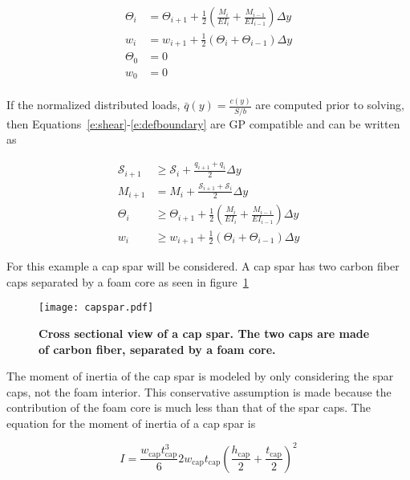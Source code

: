 \documentclass[]{aiaa-tc}%
\begin{document}
\begin{align}
    \label{e:angle}
    \Theta_{i} &= \Theta_{i+1} + \frac{1}{2} \left(\frac{M_i}{EI_i} + \frac{M_{i-1}}{EI_{i-1}} \right) \Delta y \\
    \label{e:deflection}
    w_{i} &= w_{i+1} + \frac{1}{2} (\Theta_i + \Theta_{i-1}) \Delta y \\
    \label{e:angleboundary}
    \Theta_0 &= 0 \\
    \label{e:defboundary}
    w_0 &= 0 \\
\end{align}
 
If the normalized distributed loads, $\bar{q}(y) = \frac{c(y)}{S/b}$ are computed prior to solving, then Equations~\ref{e:shear}-\ref{e:defboundary} are GP compatible and can be written as

\begin{align}
    \label{e:sheargp}
    \mathcal{S}_{i+1} &\geq \mathcal{S}_i + \frac{q_{i+1} + q_i}{2} \Delta y \\
    \label{e:momentgp}
    M_{i+1} &= M_i + \frac{\mathcal{S}_{i+1} + \mathcal{S}_i}{2} \Delta y \\
    \label{e:anglegp}
    \Theta_{i} &\geq \Theta_{i+1} + \frac{1}{2} \left(\frac{M_i}{EI_i} + \frac{M_{i-1}}{EI_{i-1}} \right) \Delta y \\
    \label{e:deflection}
    w_{i} &\geq w_{i+1} + \frac{1}{2} (\Theta_i + \Theta_{i-1}) \Delta y 
\end{align}

For this example a cap spar will be considered.  A cap spar has two carbon fiber caps separated by a foam core as seen in figure~\ref{f:capspar}

\begin{figure}[H]
	\begin{center}
	\texttt{[image: capspar.pdf]}
    \caption{ \textbf{ Cross sectional view of a cap spar.  The two caps are made of carbon fiber, separated by a foam core.}}
	\label{f:capspar}
	\end{center}
\end{figure}

The moment of inertia of the cap spar is modeled by only considering the spar caps, not the foam interior.  
This conservative assumption is made because the contribution of the foam core is much less than that of the spar caps.  
The equation for the moment of inertia\cite{bending} of a cap spar is 

\begin{equation}
    \label{e:moispar}
    I = \frac{w_{\text{cap}}t_{\text{cap}}^3}{6} 2w_{\text{cap}}t_{\text{cap}}\left( \frac{h_{\text{cap}}}{2} + \frac{t_{\text{cap}}}{2} \right)^2
\end{equation}
\end{document}
